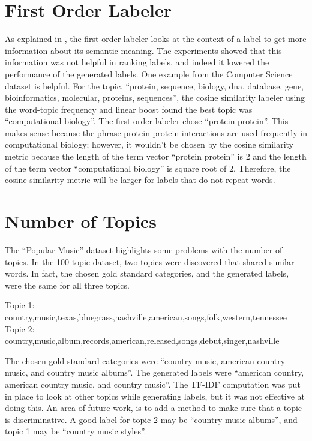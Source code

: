 \section{First Order Labeler}

As explained in \cite{mei2007automatic}, the first order labeler looks at the context of a label to get more information about its semantic meaning.  The experiments showed that this information was not helpful in ranking labels, and indeed it lowered the performance of the generated labels.  One example from the Computer Science dataset is helpful.  For the topic, ``protein, sequence, biology, dna, database, gene, bioinformatics, molecular, proteins, sequences'', the cosine similarity labeler using the word-topic frequency and linear boost found the best topic was ``computational biology''.  The first order labeler chose ``protein protein''.  This makes sense because the phrase protein protein interactions are used frequently in computational biology; however, it wouldn't be chosen by the cosine similarity metric because the length of the term vector ``protein protein'' is 2 and the length of the term vector ``computational biology'' is square root of 2.  Therefore, the cosine similarity metric will be larger for labels that do not repeat words.

\section{Number of Topics}

The ``Popular Music'' dataset highlights some problems with the number of topics.  In the 100 topic dataset, two topics were discovered that shared similar words.  In fact, the chosen gold standard categories, and the generated labels, were the same for all three topics.  

Topic 1: country,music,texas,bluegrass,nashville,american,songs,folk,western,tennessee
Topic 2: country,music,album,records,american,released,songs,debut,singer,nashville

The chosen gold-standard categories were ``country music, american country music, and country music albums''.  The generated labels were ``american country, american country music, and country music''.  The TF-IDF computation was put in place to look at other topics while generating labels, but it was not effective at doing this.  An area of future work, is to add a method to make sure that a topic is discriminative.  A good label for topic 2 may be ``country music albums'', and topic 1 may be ``country music styles''.

